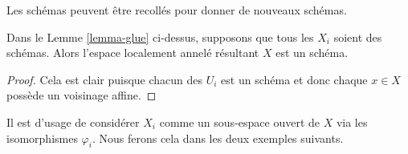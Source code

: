 \begin{lemma}
\label{lemma-glue-schemes}
\begin{slogan}
Les schémas peuvent être recollés pour donner de nouveaux schémas.
\end{slogan}
Dans le Lemme  \ref{lemma-glue}  ci-dessus, supposons que tous les  $X_i$  soient des
schémas. Alors l'espace localement annelé résultant  $X$  est un schéma.
\end{lemma}

\begin{proof}
Cela est clair puisque chacun des  $U_i$  est un schéma et donc chaque
 $x \in X$  possède un voisinage affine.
\end{proof}

\noindent
Il est d'usage de considérer  $X_i$  comme un sous-espace ouvert de
 $X$  via les isomorphismes  $\varphi_i$. Nous ferons cela dans les deux
exemples suivants.

